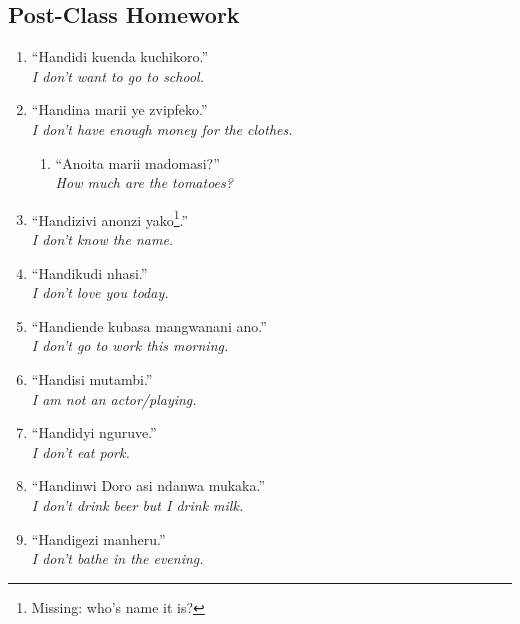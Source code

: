 \documentclass[12pt]{article}
\newcommand{\tl}[2]{``#1''\\\textit{#2}}
\begin{document}
\subsection{Post-Class Homework}
\begin{enumerate}
\item \tl{Handidi kuenda kuchikoro.}{I don't want to go to school.}
\item \tl{Handina marii ye zvipfeko.}{I don't have enough money for the clothes.}
  \begin{enumerate}
  \item \tl{Anoita marii madomasi?}{How much are the tomatoes?}
  \end{enumerate}
\item \tl{Handizivi anonzi yako\footnote{Missing: who's name it is?}.}{I don't know the name.}
\item \tl{Handikudi nhasi.}{I don't love you today.}
\item \tl{Handiende kubasa mangwanani ano.}{I don't go to work this morning.}
\item \tl{Handisi mutambi.}{I am not an actor/playing.}
\item \tl{Handidyi nguruve.}{I don't eat pork.}
\item \tl{Handinwi Doro asi ndanwa mukaka.}{I don't drink beer but I drink milk.}
\item \tl{Handigezi manheru.}{I don't bathe in the evening.}
\end{enumerate}
\end{document}
